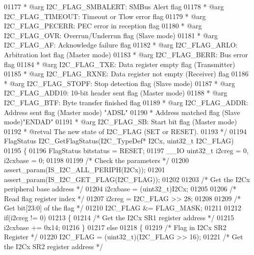 \begin{DoxyCode}
01177 \textcolor{comment}{  *            @arg I2C\_FLAG\_SMBALERT: SMBus Alert flag}
01178 \textcolor{comment}{  *            @arg I2C\_FLAG\_TIMEOUT: Timeout or Tlow error flag}
01179 \textcolor{comment}{  *            @arg I2C\_FLAG\_PECERR: PEC error in reception flag}
01180 \textcolor{comment}{  *            @arg I2C\_FLAG\_OVR: Overrun/Underrun flag (Slave mode)}
01181 \textcolor{comment}{  *            @arg I2C\_FLAG\_AF: Acknowledge failure flag}
01182 \textcolor{comment}{  *            @arg I2C\_FLAG\_ARLO: Arbitration lost flag (Master mode)}
01183 \textcolor{comment}{  *            @arg I2C\_FLAG\_BERR: Bus error flag}
01184 \textcolor{comment}{  *            @arg I2C\_FLAG\_TXE: Data register empty flag (Transmitter)}
01185 \textcolor{comment}{  *            @arg I2C\_FLAG\_RXNE: Data register not empty (Receiver) flag}
01186 \textcolor{comment}{  *            @arg I2C\_FLAG\_STOPF: Stop detection flag (Slave mode)}
01187 \textcolor{comment}{  *            @arg I2C\_FLAG\_ADD10: 10-bit header sent flag (Master mode)}
01188 \textcolor{comment}{  *            @arg I2C\_FLAG\_BTF: Byte transfer finished flag}
01189 \textcolor{comment}{  *            @arg I2C\_FLAG\_ADDR: Address sent flag (Master mode) "ADSL"}
01190 \textcolor{comment}{  *                                Address matched flag (Slave mode)"ENDAD"}
01191 \textcolor{comment}{  *            @arg I2C\_FLAG\_SB: Start bit flag (Master mode)}
01192 \textcolor{comment}{  * @retval The new state of I2C\_FLAG (SET or RESET).}
01193 \textcolor{comment}{  */}
01194 FlagStatus I2C_GetFlagStatus(I2C\_TypeDef* I2Cx, uint32\_t I2C\_FLAG)
01195 \{
01196   FlagStatus bitstatus = RESET;
01197   \_\_IO uint32\_t i2creg = 0, i2cxbase = 0;
01198 
01199   \textcolor{comment}{/* Check the parameters */}
01200   assert_param(IS\_I2C\_ALL\_PERIPH(I2Cx));
01201   assert_param(IS\_I2C\_GET\_FLAG(I2C\_FLAG));
01202 
01203   \textcolor{comment}{/* Get the I2Cx peripheral base address */}
01204   i2cxbase = (uint32\_t)I2Cx;
01205 
01206   \textcolor{comment}{/* Read flag register index */}
01207   i2creg = I2C\_FLAG >> 28;
01208 
01209   \textcolor{comment}{/* Get bit[23:0] of the flag */}
01210   I2C\_FLAG &= FLAG_MASK;
01211 
01212   \textcolor{keywordflow}{if}(i2creg != 0)
01213   \{
01214     \textcolor{comment}{/* Get the I2Cx SR1 register address */}
01215     i2cxbase += 0x14;
01216   \}
01217   \textcolor{keywordflow}{else}
01218   \{
01219     \textcolor{comment}{/* Flag in I2Cx SR2 Register */}
01220     I2C\_FLAG = (uint32\_t)(I2C\_FLAG >> 16);
01221     \textcolor{comment}{/* Get the I2Cx SR2 register address */}

\end{DoxyCode}
